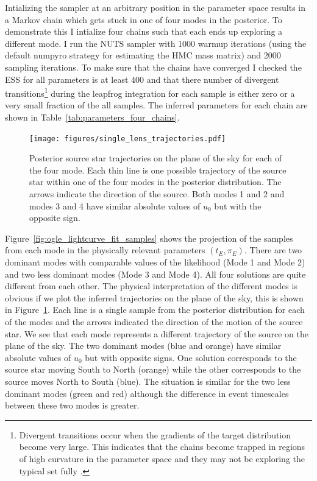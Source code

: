 \documentclass[12pt,dvipsnames]{report}
\newcommand{\ssf}[1]{\textsf{#1}}
\begin{document}
Intializing the sampler at an arbitrary position in the parameter space results in 
a Markov chain which gets stuck in one of four modes in the posterior. To demonstrate 
this I intialize four chains such that each ends up exploring a different mode.
I run the NUTS sampler with 1000 warmup iterations (using the default \ssf{numpyro} 
strategy for estimating the HMC mass matrix) and 2000 sampling iterations.
To make sure that the chains have converged I checked the ESS for all parameters 
is at least 400 and that there number of divergent transitions\footnote{Divergent 
transitions occur when the gradients of the target distribution become very large.
This indicates that the chains become trapped in regions of high curvature 
in the parameter space and they may not be exploring the typical set fully 
\citep{arXiv:1701.02434}.} during the leapfrog 
integration for each sample is either zero or a very small fraction of the all 
samples. The inferred parameters for each chain are shown in 
Table~\ref{tab:parameters_four_chains}.

\begin{figure}[t]
    \begin{centering}
        \texttt{[image: figures/single\_lens\_trajectories.pdf]}
        \caption{Posterior source star trajectories on the plane of the sky for each
        of the four mode. Each thin line is one possible trajectory of the source star 
        within one of the four modes in the posterior distribution. The arrows indicate 
        the direction of the source. Both modes 1 and 2 and modes 3 and 4 have similar 
        absolute values of $u_0$ but with the opposite sign. }
            \label{fig:ogle_lightcurve_fit_trajectories}
    \end{centering}
\end{figure}

Figure~\ref{fig:ogle_lightcurve_fit_samples} shows the projection of the samples 
from each mode in the physically relevant parameters $(t_E, \pi_E)$.
There are two dominant modes with comparable values of the likelihood (Mode 1 and 
Mode 2) and two less dominant modes (Mode 3 and Mode 4). All four solutions are 
quite different from each other. The physical interpretation of the different modes
is obvious if we plot the inferred trajectories on the plane of the sky, this is 
shown in Figure~\ref{fig:ogle_lightcurve_fit_trajectories}. Each line is a single 
sample from the posterior distribution for each of the modes and the arrows 
indicated the direction of the motion of the source star. We see that each mode 
represents a different trajectory of the source on the plane of the sky. The two 
dominant modes (blue and orange) have similar absolute values of $u_0$  
but with opposite signs. One solution corresponds to the source star moving 
South to North (orange) while the other corresponds to the source moves North to South (blue).
The situation is similar for the two less dominant modes (green and red) 
although the difference in event timescales between these two modes is greater.
\end{document}
